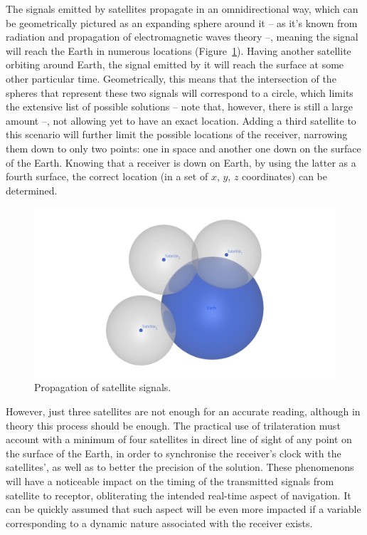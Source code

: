 The signals emitted by satellites propagate in an omnidirectional way, which can be geometrically pictured as an expanding sphere around it -- as it's known from radiation and propagation of electromagnetic waves theory --, meaning the signal will reach the Earth in numerous locations (Figure~\ref{fig:omnidirectional}).
Having another satellite orbiting around Earth, the signal emitted by it will reach the surface at some other particular time. Geometrically, this means that the intersection of the spheres that represent these two signals will correspond to a circle, which limits the extensive list of possible solutions -- note that, however, there is still a large amount --, not allowing yet to have an exact location. Adding a third satellite to this scenario will further limit the possible locations of the receiver, narrowing them down to only two points: one in space and another one down on the surface of the Earth. Knowing that a receiver is down on Earth, by using the latter as a fourth surface, the correct location (in a set of $x$, $y$, $z$ coordinates) can be determined.
\begin{figure}[ht]
	\centering
	\includegraphics[width=1.0\textwidth]{Chapters/Figures/omnidirectional.png}
	\caption{Propagation of satellite signals.}
	\label{fig:omnidirectional}
\end{figure}
However, just three satellites are not enough for an accurate reading, although in theory this process should be enough. The practical use of trilateration must account with a minimum of four satellites in direct line of sight of any point on the surface of the Earth, in order to synchronise the receiver's clock with the satellites', as well as to better the precision of the solution.
These phenomenons will have a noticeable impact on the timing of the transmitted signals from satellite to receptor, obliterating the intended real-time aspect of navigation. It can be quickly assumed that such aspect will be even more impacted if a variable corresponding to a dynamic nature associated with the receiver exists.
